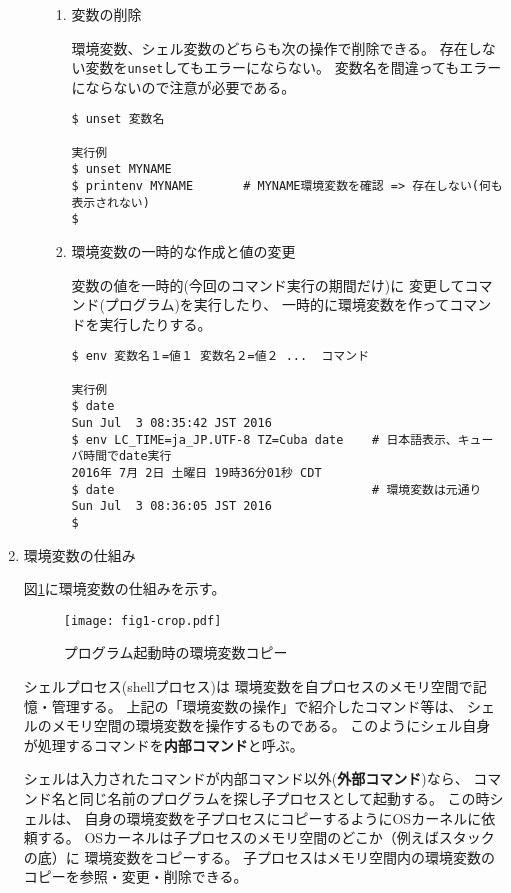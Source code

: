 \documentclass[a4j,dvipdfmx]{jarticle}
\begin{document}
\begin{enumerate}
\begin{enumerate}
\begin{enumerate}
\item 変数の削除

環境変数、シェル変数のどちらも次の操作で削除できる。
存在しない変数を\verb/unset/してもエラーにならない。
変数名を間違ってもエラーにならないので注意が必要である。

\begin{lstlisting}[numbers=none]
$ unset 変数名

実行例
$ unset MYNAME
$ printenv MYNAME       # MYNAME環境変数を確認 => 存在しない(何も表示されない)
$
\end{lstlisting}

\item 環境変数の一時的な作成と値の変更

変数の値を一時的(今回のコマンド実行の期間だけ)に
変更してコマンド(プログラム)を実行したり、
一時的に環境変数を作ってコマンドを実行したりする。

\begin{lstlisting}[numbers=none]
$ env 変数名１=値１ 変数名２=値２ ...  コマンド

実行例
$ date
Sun Jul  3 08:35:42 JST 2016
$ env LC_TIME=ja_JP.UTF-8 TZ=Cuba date    # 日本語表示、キューバ時間でdate実行
2016年 7月 2日 土曜日 19時36分01秒 CDT
$ date                                    # 環境変数は元通り
Sun Jul  3 08:36:05 JST 2016
$
\end{lstlisting}

\end{enumerate}

\end{enumerate}

\item 環境変数の仕組み

図\ref{fig1}に環境変数の仕組みを示す。

\begin{figure}[hbtp]
  \begin{center} %
    \texttt{[image: fig1-crop.pdf]}
    \caption{プログラム起動時の環境変数コピー}
    \label{fig1}
  \end{center}
\end{figure}

シェルプロセス(shellプロセス)は
環境変数を自プロセスのメモリ空間で記憶・管理する。
上記の「環境変数の操作」で紹介したコマンド等は、
シェルのメモリ空間の環境変数を操作するものである。
このようにシェル自身が処理するコマンドを{\bf 内部コマンド}と呼ぶ。

シェルは入力されたコマンドが内部コマンド以外({\bf 外部コマンド})なら、
コマンド名と同じ名前のプログラムを探し子プロセスとして起動する。
この時シェルは、
自身の環境変数を子プロセスにコピーするようにOSカーネルに依頼する。
OSカーネルは子プロセスのメモリ空間のどこか（例えばスタックの底）に
環境変数をコピーする。
子プロセスはメモリ空間内の環境変数のコピーを参照・変更・削除できる。


\end{enumerate}
\end{document}
